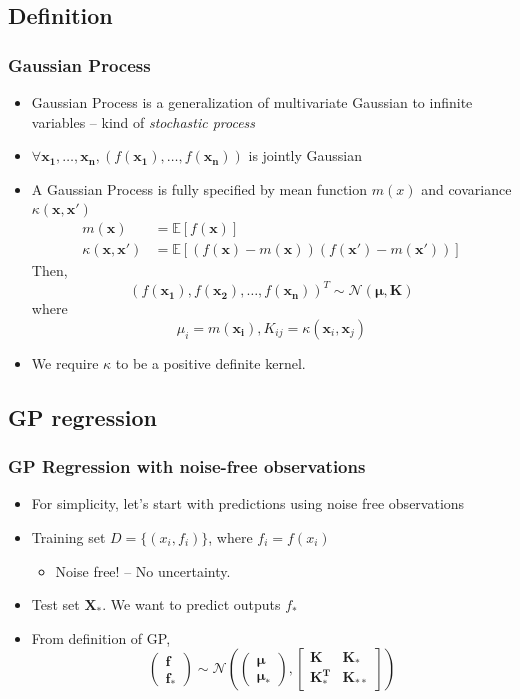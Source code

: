 \documentclass{beamer}
\begin{document}
\subsection{Definition}
\begin{frame}
	\frametitle{Gaussian Process}
	\begin{itemize}
		\item Gaussian Process is a generalization of multivariate Gaussian to infinite variables -- kind of {\em stochastic process}
		\item $\forall \mathbf{x_1}, \ldots, \mathbf{x_n}, (f(\mathbf{x_1}), \ldots, f(\mathbf{x_n}))$ is jointly Gaussian
		\item A Gaussian Process is fully specified by mean function $m(x)$ and covariance $\kappa(\mathbf{x}, \mathbf{x'})$
		\begin{align*}
				m(\mathbf{x}) &= \mathbb{E}[f(\mathbf{x})] \\
				\kappa(\mathbf{\mathbf{x}}, \mathbf{\mathbf{x'}}) &= \mathbb{E}[(f(\mathbf{x})-m(\mathbf{x}))(f(\mathbf{x'})-m(\mathbf{x'}))]				
		\end{align*}	
		Then, 
		\[
			 (f(\mathbf{x_1}), f(\mathbf{x_2}), \ldots, f(\mathbf{x_n}))^T \sim \mathcal{N}(\bm{\mu}, \bm{K})			 
		\]
		where
		\[
			\mu_i = m(\mathbf{x_i}), K_{ij} = \kappa(\mathbf{x}_i, \mathbf{x}_j)
		\]
		\item We require $\kappa$ to be a positive definite kernel.
	\end{itemize}
\end{frame}
\subsection{GP regression}
\begin{frame}
	\frametitle{GP Regression with noise-free observations}
	\begin{itemize}
			\item For simplicity, let's start with predictions using noise free observations
			\item Training set $D=\{(x_i, f_i)\}$, where $f_i=f(x_i)$
				\begin{itemize}
					\item Noise free! -- No uncertainty.
				\end{itemize}
			\item Test set $\mathbf{X_*}$. We want to predict outputs $f_*$
			\item From definition of GP,
		\[\left( {\begin{array}{*{20}{c}}
			\bm{f}\\
			{\bm{f_*}}
			\end{array}} \right)\sim \mathcal{N}\left( {\left( {\begin{array}{*{20}{c}}
			\bm{\mu} \\
			{\bm{\mu _*}}
			\end{array}} \right),\left[ {\begin{array}{*{20}{c}}
			\bm{K}&{\bm{K_*}}\\
			\bm{K_*^T}&{\bm{K_{**}}}
			\end{array}} \right]} \right)\]
	\end{itemize}
\end{frame}
\end{document}
